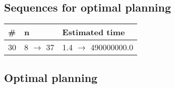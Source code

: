 \documentclass{article}
\begin{document}
                            \subsection*{Sequences for optimal planning}

                            \begin{center}
                            \begin{tabular}{@{}l|l|l@{}}
                            \# & n & Estimated time\\\midrule
                            30&8 $\rightarrow$ 37&1.4 $\rightarrow$ 490000000.0
                            \end{tabular}
                            \end{center}
                    
                                \subsection*{Optimal planning}
                                
\end{document}
